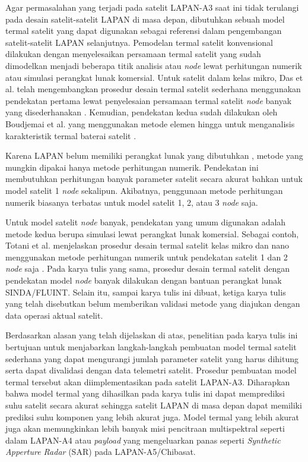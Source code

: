 Agar permasalahan yang terjadi pada satelit LAPAN-A3 saat ini tidak terulangi
pada desain satelit-satelit LAPAN di masa depan, dibutuhkan sebuah model termal
satelit yang dapat digunakan sebagai referensi dalam pengembangan
satelit-satelit LAPAN selanjutnya. Pemodelan termal satelit konvensional
dilakukan dengan menyelesaikan persamaan termal satelit yang sudah dimodelkan
menjadi beberapa titik analisis atau \textit{node} lewat perhitungan numerik
atau simulasi perangkat lunak komersial. Untuk satelit dalam kelas mikro, Das
et al. telah mengembangkan prosedur desain termal satelit sederhana menggunakan
pendekatan pertama lewat penyelesaian persamaan termal satelit \textit{node}
banyak yang disederhanakan \cite{das}. Kemudian, pendekatan kedua sudah
dilakukan oleh Boudjemai et al. yang menggunakan metode elemen hingga untuk
menganalisis karakteristik termal baterai satelit \cite{boudjemai2015}.

Karena LAPAN belum memiliki perangkat lunak yang dibutuhkan
\cite{budiantoro2019}, metode yang mungkin dipakai hanya metode perhitungan
numerik. Pendekatan ini membutuhkan perhitungan banyak parameter satelit secara
akurat bahkan untuk model satelit 1 \textit{node} sekalipun. Akibatnya, penggunaan
metode perhitungan numerik biasanya terbatas untuk model satelit 1, 2, atau 3
\textit{node} saja. 

Untuk model satelit \textit{node} banyak, pendekatan yang umum digunakan adalah
metode kedua berupa simulasi lewat perangkat lunak komersial. Sebagai contoh,
Totani et al. menjelaskan prosedur desain termal satelit kelas mikro dan nano
menggunakan metode perhitungan numerik untuk pendekatan satelit 1 dan 2
\textit{node} saja \cite{totani2014}. Pada karya tulis yang sama, prosedur
desain termal satelit dengan pendekatan model \textit{node} banyak dilakukan
dengan bantuan perangkat lunak SINDA/FLUINT. Selain itu, sampai karya tulis ini
dibuat, ketiga karya tulis yang telah disebutkan belum memberikan validasi
metode yang diajukan dengan data operasi aktual satelit.

Berdasarkan alasan yang telah dijelaskan di atas, penelitian pada karya tulis
ini bertujuan untuk menjabarkan langkah-langkah pembuatan model termal satelit
sederhana yang dapat mengurangi jumlah parameter satelit yang harus dihitung
serta dapat divalidasi dengan data telemetri satelit. Prosedur pembuatan model
termal tersebut akan diimplementasikan pada satelit LAPAN-A3. Diharapkan bahwa
model termal yang dihasilkan pada karya tulis ini dapat memprediksi suhu
satelit secara akurat sehingga satelit LAPAN di masa depan dapat memiliki
prediksi suhu komponen yang lebih akurat juga. Model termal yang lebih akurat
juga akan memungkinkan lebih banyak misi pencitraan multispektral seperti dalam
LAPAN-A4 atau \textit{payload} yang mengeluarkan panas seperti
\textit{Synthetic Apperture Radar} (SAR) pada LAPAN-A5/Chibasat.


